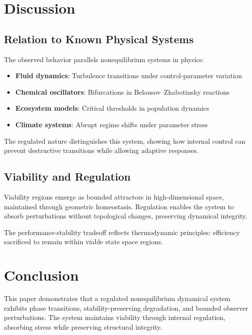 \documentclass[12pt,a4paper]{article}
\begin{document}
\section{Discussion}

\subsection{Relation to Known Physical Systems}

The observed behavior parallels nonequilibrium systems in physics:
\begin{itemize}
    \item \textbf{Fluid dynamics}: Turbulence transitions under control‑parameter variation
    \item \textbf{Chemical oscillators}: Bifurcations in Belousov--Zhabotinsky reactions
    \item \textbf{Ecosystem models}: Critical thresholds in population dynamics
    \item \textbf{Climate systems}: Abrupt regime shifts under parameter stress
\end{itemize}

The regulated nature distinguishes this system, showing how internal control can prevent destructive transitions while allowing adaptive responses.

\subsection{Viability and Regulation}

Viability regions emerge as bounded attractors in high-dimensional space, maintained through geometric homeostasis. Regulation enables the system to absorb perturbations without topological changes, preserving dynamical integrity.

The performance-stability tradeoff reflects thermodynamic principles: efficiency sacrificed to remain within viable state space regions.

\section{Conclusion}

This paper demonstrates that a regulated nonequilibrium dynamical system exhibits phase transitions, stability-preserving degradation, and bounded observer perturbations. The system maintains viability through internal regulation, absorbing stress while preserving structural integrity.
\end{document}
